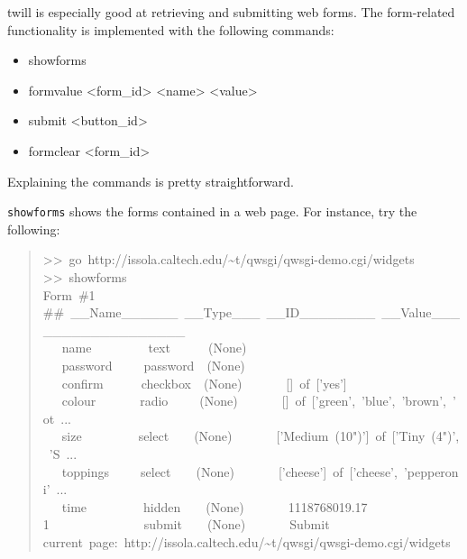 \documentclass[10pt,a4paper,english]{article}
\begin{document}
twill is especially good at retrieving and submitting web forms. The
form-related functionality is implemented with the following commands:
\begin{itemize}
\item {} 
showforms

\item {} 
formvalue {\textless}form{\_}id{\textgreater} {\textless}name{\textgreater} {\textless}value{\textgreater}

\item {} 
submit {\textless}button{\_}id{\textgreater}

\item {} 
formclear {\textless}form{\_}id{\textgreater}

\end{itemize}

Explaining the commands is pretty straightforward.

\texttt{showforms} shows the forms contained in a web page. For instance, try
the following:
\begin{quote}{\ttfamily \raggedright \noindent
>{}>~go~http://issola.caltech.edu/{\textasciitilde}t/qwsgi/qwsgi-demo.cgi/widgets~\\
>{}>~showforms~\\
Form~{\#}1~\\
{\#}{\#}~{\_}{\_}Name{\_}{\_}{\_}{\_}{\_}{\_}~{\_}{\_}Type{\_}{\_}{\_}~{\_}{\_}ID{\_}{\_}{\_}{\_}{\_}{\_}{\_}{\_}~{\_}{\_}Value{\_}{\_}{\_}{\_}{\_}{\_}{\_}{\_}{\_}{\_}{\_}{\_}{\_}{\_}{\_}{\_}{\_}{\_}~\\
~~~name~~~~~~~~~text~~~~~~(None)~\\
~~~password~~~~~password~~(None)~\\
~~~confirm~~~~~~checkbox~~(None)~~~~~~~{[}]~of~{[}'yes']~\\
~~~colour~~~~~~~radio~~~~~(None)~~~~~~~{[}]~of~{[}'green',~'blue',~'brown',~'ot~...~\\
~~~size~~~~~~~~~select~~~~(None)~~~~~~~{[}'Medium~(10")']~of~{[}'Tiny~(4")',~'S~...~\\
~~~toppings~~~~~select~~~~(None)~~~~~~~{[}'cheese']~of~{[}'cheese',~'pepperoni'~...~\\
~~~time~~~~~~~~~hidden~~~~(None)~~~~~~~1118768019.17~\\
1~~~~~~~~~~~~~~~submit~~~~(None)~~~~~~~Submit~\\
current~page:~http://issola.caltech.edu/{\textasciitilde}t/qwsgi/qwsgi-demo.cgi/widgets
}\end{quote}
\end{document}
